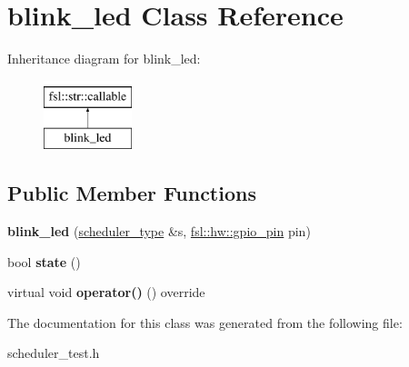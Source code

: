 \hypertarget{classblink__led}{}\section{blink\+\_\+led Class Reference}
\label{classblink__led}
Inheritance diagram for blink\+\_\+led\+:\begin{figure}[H]
\begin{center}
\leavevmode
\includegraphics[height=2.000000cm]{classblink__led}
\end{center}
\end{figure}
\subsection*{Public Member Functions}
\begin{DoxyCompactItemize}
\item 
\mbox{\label{classblink__led_ac5b7d603c172939531c07ed2bf13d1ac}} 
{\bfseries blink\+\_\+led} (\mbox{\hyperlink{classfsl_1_1os_1_1scheduler}{scheduler\+\_\+type}} \&s, \mbox{\hyperlink{classfsl_1_1hw_1_1gpio__pin}{fsl\+::hw\+::gpio\+\_\+pin}} pin)
\item 
\mbox{\label{classblink__led_a157ea99593114bc89947c3390448cc91}} 
bool {\bfseries state} ()
\item 
\mbox{\label{classblink__led_a4533015bc2c3277dc6294774702b58b7}} 
virtual void {\bfseries operator()} () override
\end{DoxyCompactItemize}


The documentation for this class was generated from the following file\+:\begin{DoxyCompactItemize}
\item 
scheduler\+\_\+test.\+h\end{DoxyCompactItemize}
